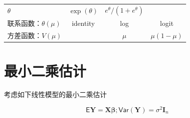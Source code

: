 \documentclass[12pt,a4paper,UTF8,twoside]{book}
\theoremstyle{definition}
\theoremstyle{definition}
\theoremstyle{definition}
\theoremstyle{remark}
\begin{document}
\begin{longtable}[]{@{}lccc@{}}
\begin{minipage}[t]{0.22\columnwidth}
\(\theta\)\strut
\end{minipage} & \begin{minipage}[t]{0.22\columnwidth}\centering
\(\exp(\theta)\)\strut
\end{minipage} & \begin{minipage}[t]{0.22\columnwidth}\centering
\(e^{\theta}/(1+e^{\theta})\)\strut
\end{minipage}\tabularnewline
\begin{minipage}[t]{0.21\columnwidth}\raggedright
联系函数：\(\theta(\mu)\)\strut
\end{minipage} & \begin{minipage}[t]{0.22\columnwidth}\centering
identity\strut
\end{minipage} & \begin{minipage}[t]{0.22\columnwidth}\centering
log\strut
\end{minipage} & \begin{minipage}[t]{0.22\columnwidth}\centering
logit\strut
\end{minipage}\tabularnewline
\begin{minipage}[t]{0.21\columnwidth}\raggedright
方差函数：\(V(\mu)\)\strut
\end{minipage} & \begin{minipage}[t]{0.22\columnwidth}\centering
1\strut
\end{minipage} & \begin{minipage}[t]{0.22\columnwidth}\centering
\(\mu\)\strut
\end{minipage} & \begin{minipage}[t]{0.22\columnwidth}\centering
\(\mu(1-\mu)\)\strut
\end{minipage}\tabularnewline
\bottomrule
\end{longtable}






\hypertarget{lse}{%
\section{最小二乘估计}\label{lse}}

考虑如下线性模型的最小二乘估计

\begin{equation}
\mathsf{E}\mathbf{Y} = \mathbf{X}\boldsymbol{\beta}; \mathsf{Var}(\mathbf{Y}) = \sigma^2 \mathbf{I}_{n} \label{eq:linear-models}
\end{equation}
\end{document}
